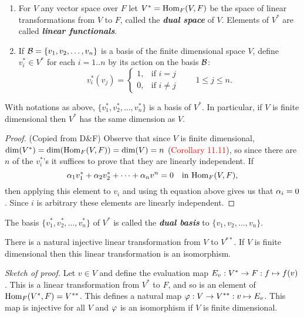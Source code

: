 \nl

\begin{defn}\nl
\begin{enumerate}
\item For $V$ any vector space over $F$ let $V^* = \text{Hom}_F(V,F)$ be the space of linear transformations from $V$ to $F$, called the \textit{\textbf{dual space}} of $V$. Elements of $V^*$ are called \textit{\textbf{linear functionals}}.
\item If $\mathcal{B}  = \{v_1,v_2,\ldots,v_n\}$ is a basis of the finite dimensional space $V$, define $v_i^* \in V^*$ for each $i = 1..n$ by its action on the basis $\mathcal{B}$:
\[v_i^*(v_j) = \begin{cases}1, & \text{if } i = j\\
0, & \text{if } i \neq j\end{cases}\qquad 1\leq j\leq n.\]
\end{enumerate}
\end{defn}

\nl

\begin{prop}
With notations as above, $\{v_1^*,v_2^*,\ldots,v_n^*\}$ is a basis of $V^*$. In particular, if $V$ is finite dimensional then $V^*$ has the same dimension as $V$.

\begin{proof}
(Copied from D\&F) Observe that since $V$ is finite dimensional, $\dim(V^*) = \dim(\text{Hom}_F(V,F)) = \dim(V) = n$ (\textcolor{red}{Corollary 11.11}), so since there are $n$ of the $v_i^*$'s it suffices to prove that they are linearly independent. If
\[\alpha_1v_1^* + \alpha_2v_2^* + \cdots + \alpha_nv^n = 0\quad \text{in } \text{Hom}_F(V,F),\]
then applying this element to $v_i$ and using th equation above gives us that $\alpha_i = 0$. Since $i$ is arbitrary these elements are linearly independent.
\end{proof}
\end{prop}

\nl

\begin{defn}
The basis $\{v_1^*,v_2^*,\ldots,v_n^*\}$ of $V^*$ is called the \textit{\textbf{dual basis}} to  $\{v_1,v_2,\ldots,v_n\}$.
\end{defn}

\nl

\begin{thm}
There is a natural injective linear transformation from $V$ to $V^{**}$. If $V$ is finite dimensional then this linear transformation is an isomorphism. 

\textit{Sketch of proof.} Let $v\in V$ and define the evaluation map $E_v:V^*\rightarrow F:f\mapsto f(v)$. This is a linear transformation from $V^*$ to $F$, and so is an element of $\text{Hom}_F(V^*, F) = V^{**}$. This defines a natural map $\varphi: V\rightarrow V^{**}:v\mapsto E_v$. This map is injective for all $V$ and $\varphi$ is an isomorphism if $V$ is finite dimensional.
\end{thm}

